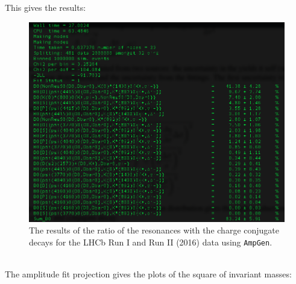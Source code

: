 This gives the results:
\begin{figure}[h]
\center
\includegraphics*[width=0.96\linewidth]{amplitude_fit/resonance_ratio_conj}
\caption{The results of the ratio of the resonances with the charge conjugate decays for the LHCb Run I and Run II (2016) data using \texttt{AmpGen}.}
\label{resonance_ratio_conj}
\end{figure}
\\
The amplitude fit projection gives the plots of the square of invariant masses:
